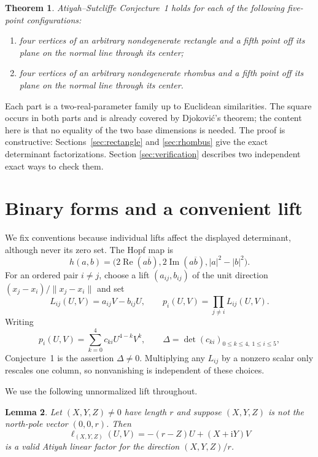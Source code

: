 \documentclass[11pt]{amsart}
\newtheorem{theorem}{Theorem}[section]
\newtheorem{lemma}[theorem]{Lemma}
\theoremstyle{definition}
\newcommand{\ii}{\mathrm{i}}
\newcommand{\DeltaA}{\mathit{\Delta}}
\begin{document}
\begin{theorem}\label{thm:intro}
Atiyah--Sutcliffe Conjecture~1 holds for each of the following five-point
configurations:
\begin{enumerate}
\item four vertices of an arbitrary nondegenerate rectangle and a fifth
point off its plane on the normal line through its center;
\item four vertices of an arbitrary nondegenerate rhombus and a fifth point
off its plane on the normal line through its center.
\end{enumerate}
\end{theorem}

Each part is a two-real-parameter family up to Euclidean similarities. The
square occurs in both parts and is already covered by Djokovi\'c's theorem;
the content here is that no equality of the two base dimensions is needed.
The proof is constructive: Sections~\ref{sec:rectangle} and
\ref{sec:rhombus} give the exact determinant factorizations. Section
\ref{sec:verification} describes two independent exact ways to check them.

\section{Binary forms and a convenient lift}\label{sec:binary}

We fix conventions because individual lifts affect the displayed
determinant, although never its zero set. The Hopf map is
\[
h(a,b)=\bigl(2\operatorname{Re}(a\overline b),
2\operatorname{Im}(a\overline b),|a|^2-|b|^2\bigr).
\]
For an ordered pair $i\ne j$, choose a lift $(a_{ij},b_{ij})$ of the unit
direction $(x_j-x_i)/\lVert x_j-x_i\rVert$ and set
\[
L_{ij}(U,V)=a_{ij}V-b_{ij}U,
\qquad p_i(U,V)=\prod_{j\ne i}L_{ij}(U,V).
\]
Writing
\[
p_i(U,V)=\sum_{k=0}^4c_{ki}U^{4-k}V^k,
\qquad \DeltaA=\det(c_{ki})_{0\leq k\leq4,\ 1\leq i\leq5},
\]
Conjecture~1 is the assertion $\DeltaA\ne0$. Multiplying any $L_{ij}$ by a
nonzero scalar only rescales one column, so nonvanishing is independent of
these choices.

We use the following unnormalized lift throughout.

\begin{lemma}\label{lem:lift}
Let $(X,Y,Z)\ne0$ have length $r$ and suppose $(X,Y,Z)$ is not the north-pole
vector $(0,0,r)$. Then
\[
\ell_{(X,Y,Z)}(U,V)=-(r-Z)U+(X+\ii Y)V                     \tag{2.1}
\]
is a valid Atiyah linear factor for the direction $(X,Y,Z)/r$.
\end{lemma}
\end{document}
